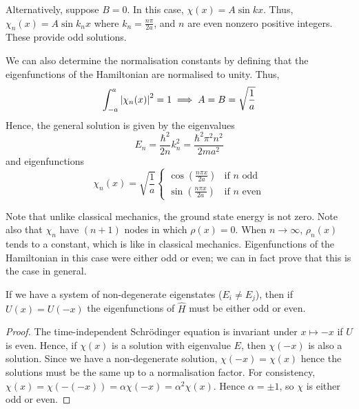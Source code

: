 Alternatively, suppose \( B = 0 \).
In this case, \( \chi(x) = A \sin kx \).
Thus, \( \chi_n(x) = A \sin k_n x \) where \( k_n = \frac{n \pi}{2a} \), and \( n \) are even nonzero positive integers.
These provide odd solutions.

We can also determine the normalisation constants by defining that the eigenfunctions of the Hamiltonian are normalised to unity.
Thus,
\[
	\int_{-a}^a \abs{\chi_n(x)}^2 = 1 \implies A = B = \sqrt{\frac{1}{a}}
\]
Hence, the general solution is given by the eigenvalues
\[
	E_n = \frac{\hbar^2}{2n} k_n^2 = \frac{\hbar^2 \pi^2 n^2}{2ma^2}
\]
and eigenfunctions
\[
	\chi_n(x) = \sqrt{\frac{1}{a}} \begin{cases}
		\cos(\frac{n \pi x}{2a}) & \text{if } n \text{ odd}  \\
		\sin(\frac{n \pi x}{2a}) & \text{if } n \text{ even}
	\end{cases}
\]
\begin{remark}
	Note that unlike classical mechanics, the ground state energy is not zero.
	Note also that \( \chi_n \) have \( (n+1) \) nodes in which \( \rho(x) = 0 \).
	When \( n \to \infty \), \( \rho_n(x) \) tends to a constant, which is like in classical mechanics.
	Eigenfunctions of the Hamiltonian in this case were either odd or even; we can in fact prove that this is the case in general.
\end{remark}
\begin{proposition}
	If we have a system of non-degenerate eigenstates (\( E_i \neq E_j \)),  then if \( U(x) = U(-x) \) the eigenfunctions of \( \hat H \) must be either odd or even.
\end{proposition}
\begin{proof}
	The time-independent Schr\"odinger equation is invariant under \( x \mapsto -x \) if \( U \) is even.
	Hence, if \( \chi(x) \) is a solution with eigenvalue \( E \), then \( \chi(-x) \) is also a solution.
	Since we have a non-degenerate solution, \( \chi(-x) = \chi(x) \) hence the solutions must be the same up to a normalisation factor.
	For consistency, \( \chi(x) = \chi(-(-x)) = \alpha \chi(-x) = \alpha^2 \chi(x) \).
	Hence \( \alpha = \pm 1 \), so \( \chi \) is either odd or even.
\end{proof}

